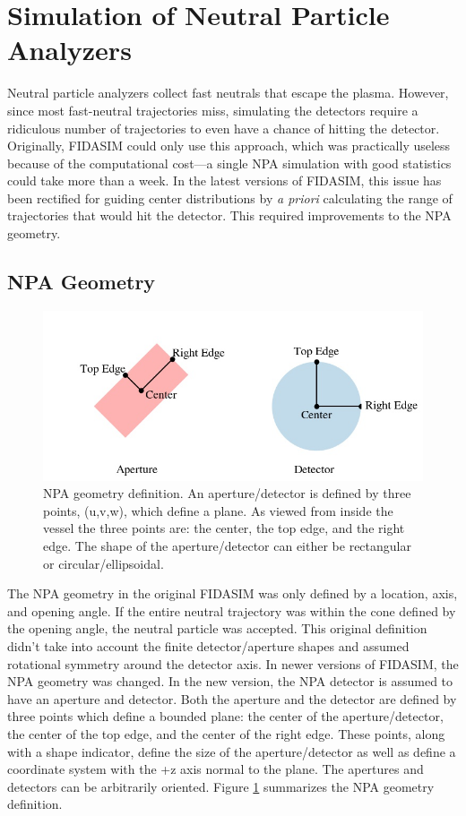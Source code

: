 \section{Simulation of Neutral Particle Analyzers}
Neutral particle analyzers collect fast neutrals that escape the plasma. However, since most fast-neutral trajectories miss, simulating the detectors require a ridiculous number of trajectories to even have a chance of hitting the detector. Originally, FIDASIM could only use this approach, which was practically useless because of the computational cost---a single NPA simulation with good statistics could take more than a week. In the latest versions of FIDASIM, this issue has been rectified for guiding center distributions by \textit{a priori} calculating the range of trajectories that would hit the detector. This required improvements to the NPA geometry.

\subsection{NPA Geometry}
\begin{figure}[h!]
    \centering
    \includegraphics[width=15cm]{figures/npa_geom.jpg}
    \caption{NPA geometry definition. An aperture/detector is defined by three points, (u,v,w), which define a plane. As viewed from inside the vessel the three points are: the center, the top edge, and the right edge. The shape of the aperture/detector can either be rectangular or circular/ellipsoidal.}
    \label{fig:npa_geom}
\end{figure}
The NPA geometry in the original FIDASIM was only defined by a location, axis, and opening angle. If the entire neutral trajectory was within the cone defined by the opening angle, the neutral particle was accepted. This original definition didn't take into account the finite detector/aperture shapes and assumed rotational symmetry around the detector axis.
In newer versions of FIDASIM, the NPA geometry was changed. In the new version, the NPA detector is assumed to have an aperture and detector. Both the aperture and the detector are defined by three points which define a bounded plane: the center of the aperture/detector, the center of the top edge, and the center of the right edge. These points, along with a shape indicator, define the size of the aperture/detector as well as define a coordinate system with the +z axis normal to the plane. The apertures and detectors can be arbitrarily oriented. Figure \ref{fig:npa_geom} summarizes the NPA geometry definition.

